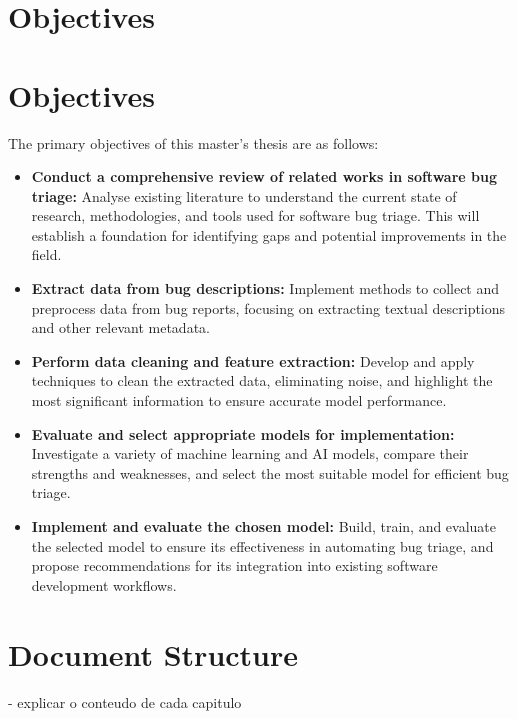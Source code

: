\section{Objectives}
\label{sec:objectives}

\section*{Objectives}

The primary objectives of this master's thesis are as follows:

\begin{itemize}
    \item \textbf{Conduct a comprehensive review of related works in software bug triage:} 
    Analyse existing literature to understand the current state of research, methodologies, and tools used for software bug triage. This will establish a foundation for identifying gaps and potential improvements in the field.
    
    \item \textbf{Extract data from bug descriptions:} 
    Implement methods to collect and preprocess data from bug reports, focusing on extracting textual descriptions and other relevant metadata.
    
    \item \textbf{Perform data cleaning and feature extraction:} 
    Develop and apply techniques to clean the extracted data, eliminating noise, and highlight the most significant information to ensure accurate model performance.
    
    \item \textbf{Evaluate and select appropriate models for implementation:} 
    Investigate a variety of machine learning and AI models, compare their strengths and weaknesses, and select the most suitable model for efficient bug triage.
    
    \item \textbf{Implement and evaluate the chosen model:} 
    Build, train, and evaluate the selected model to ensure its effectiveness in automating bug triage, and propose recommendations for its integration into existing software development workflows.
\end{itemize}



\section{Document Structure}
\label{sec:doc_structure}

- explicar o conteudo de cada capitulo 